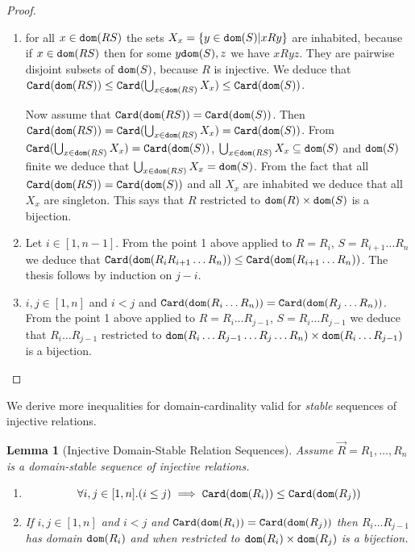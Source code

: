\documentclass{lmcs}
\newtheorem{lemma}[theorem]{Lemma}
\begin{document}
\begin{proof}
\begin{enumerate}

\item
for all $x \in {\tt dom}(RS)$ the sets $X_x = \{ y \in {\tt dom}(S) | x R y \}$ are inhabited,
because if $x \in {\tt dom}(RS)$ then for some $y {\tt dom}(S), z$ we have $x R y z$.
They are pairwise disjoint subsets of ${\tt dom}(S)$, because $R$ is injective. We deduce that 
${\tt Card}({\tt dom}(RS)) \le {\tt Card}(\bigcup_{x \in {\tt dom}(RS)} X_x) \le {\tt Card}({\tt dom}(S))$.

Now assume that ${\tt Card}({\tt dom}(RS)) = {\tt Card}({\tt dom}(S))$. Then 
${\tt Card}({\tt dom}(RS)) = {\tt Card}(\bigcup_{x \in {\tt dom}(RS)} X_x) = {\tt Card}({\tt dom}(S))$. 
From ${\tt Card}(\bigcup_{x \in {\tt dom}(RS)} X_x) = {\tt Card}({\tt dom}(S))$, 
$\bigcup_{x \in {\tt dom}(RS)} X_x \subseteq {\tt dom}(S)$ and ${\tt dom}(S)$ finite we deduce
that $\bigcup_{x \in {\tt dom}(RS)} X_x = {\tt dom}(S)$. 
From the fact that all ${\tt Card}({\tt dom}(RS)) = {\tt Card}({\tt dom}(S))$ and all $X_x$ are inhabited we 
deduce that all $X_x$ are singleton. This says that $R$ restricted to ${\tt dom}(R) \times {\tt dom}(S)$
is a bijection.

\item
Let $i \in [1,n-1]$.
From the point 1 above applied to $R = R_i$, $S = R_{i+1}\ldots R_n$ we deduce that
${\tt Card}({\tt dom}(R_i R_{i+1}\ldots R_n)) \le {\tt Card}({\tt dom}(R_{i+1} \ldots R_n))$. The thesis
follows by induction on $j-i$.

\item
$i, j \in[1,n]$ and $i < j$ and ${\tt Card}({\tt dom}(R_i \ldots R_n)) = {\tt Card}({\tt dom}(R_j \ldots R_n))$.
From the point 1 above applied to $R = R_i \ldots R_{j-1}$, $S = R_i \ldots R_{j-1}$ 
we deduce that $R_i \ldots R_{j-1}$ restricted to 
${\tt dom}(R_i \ldots R_{j-1} \ldots R_j \ldots R_n) \times {\tt dom}(R_i \ldots R_{j-1})$
is a bijection.

\end{enumerate}
\end{proof}

We derive more inequalities for domain-cardinality
valid for \emph{stable} sequences of injective relations. 


\begin{lemma}[Injective Domain-Stable Relation Sequences]
\label{lemma-injective-stable-sequences}
Assume $\vec{R}=R_1, \ldots, R_n$ is a \emph{domain-stable}
sequence of \emph{injective} relations.
\begin{enumerate}

\item
\label{lemma-injective-stable-sequences-01}
$$
\forall i,j \in [1,n]. (i \le j) \implies {\tt Card}({\tt dom}(R_i)) \le {\tt Card}({\tt dom}(R_j))
$$

\item
\label{lemma-injective-stable-sequences-02}
If  $i, j \in[1,n]$ and $i < j$ and ${\tt Card}({\tt dom}(R_i)) = {\tt Card}({\tt dom}(R_j))$
then $R_i \ldots R_{j-1}$ has domain ${\tt dom}(R_i)$ and
when restricted to ${\tt dom}(R_i) \times {\tt dom}(R_j)$
is a bijection.
\end{enumerate}
\end{lemma}
\end{document}
